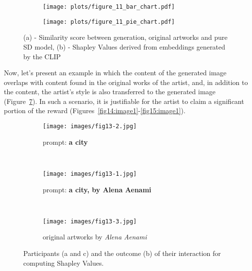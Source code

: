 \documentclass[12pt, letterpaper]{article}
\begin{document}
\begin{figure}[h]
  \centering
  \begin{subfigure}[b]{0.6\textwidth}
    \texttt{[image: plots/figure\_11\_bar\_chart.pdf]}
    \caption{}
        \label{fig11:image1}
  \end{subfigure}%
  \begin{subfigure}[b]{0.4\textwidth}
    \texttt{[image: plots/figure\_11\_pie\_chart.pdf]}
    \caption{}
        \label{fig11:image2}
  \end{subfigure}
 \captionsetup{justification=centering}
  \caption{(a) - Similarity score between generation, original artworks and pure SD model, (b) - Shapley Values derived from embeddings generated by the CLIP}
  \label{fig11}
\end{figure}

Now, let's present an example in which the content of the generated image overlaps with content found in the original works of the artist, and, in addition to the content, the artist's style is also transferred to the generated image (Figure~\ref{fig13:stacked_images}). In such a scenario, it is justifiable for the artist to claim a significant portion of the reward (Figures~\ref{fig14:image1}-\ref{fig15:image1}).

\begin{figure}[h]
    \centering
    
    \begin{subfigure}{\textwidth}
        \centering
        \texttt{[image: images/fig13-2.jpg]}
        \caption{prompt: \textbf{a city}}
        \label{fig13:sub1}
    \end{subfigure}
    \\
    
    \begin{subfigure}{\textwidth}
        \centering
        \texttt{[image: images/fig13-1.jpg]}
        \caption{prompt: \textbf{a city, by Alena Aenami}}
        \label{fig13:sub2}
    \end{subfigure}
    \\
   
    \begin{subfigure}{\textwidth}
        \centering
        \texttt{[image: images/fig13-3.jpg]}
        \caption{original artworks by \textit{Alena Aenami}}
        \label{fig13:sub3}
    \end{subfigure}    

    \caption{Participants (a and c) and the outcome (b) of their interaction for computing Shapley Values.}
    \label{fig13:stacked_images}
\end{figure}
\end{document}
